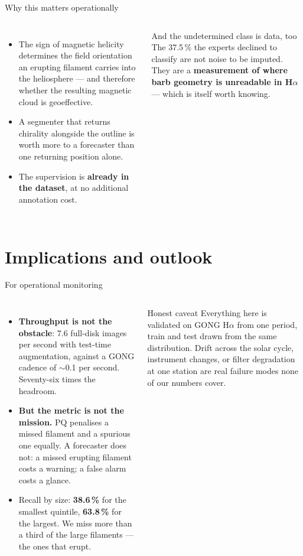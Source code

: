 \documentclass[aspectratio=169,xcolor=dvipsnames]{beamer}
\begin{document}
\begin{frame}{Why this matters operationally}
  \begin{columns}
      \begin{itemize}
        \item The sign of magnetic helicity determines the field orientation an erupting filament carries into the heliosphere --- and therefore whether the resulting magnetic cloud is geoeffective.
        \item A segmenter that returns chirality alongside the outline is worth more to a forecaster than one returning position alone.
        \item The supervision is \textbf{already in the dataset}, at no additional annotation cost.
      \end{itemize}
      \begin{exampleblock}{And the undetermined class is data, too}
        \small
        The 37.5\,\% the experts declined to classify are not noise to be imputed. They are a \textbf{measurement of where barb geometry is unreadable in H$\alpha$} --- which is itself worth knowing.
      \end{exampleblock}
  \end{columns}
\end{frame}

\section{Implications and outlook}

\begin{frame}{For operational monitoring}
  \begin{columns}
      \begin{itemize}
        \item \textbf{Throughput is not the obstacle}: 7.6 full-disk images per second with test-time augmentation, against a GONG cadence of $\sim$0.1 per second. Seventy-six times the headroom.
        \item \textbf{But the metric is not the mission.} PQ penalises a missed filament and a spurious one equally. A forecaster does not: a missed erupting filament costs a warning; a false alarm costs a glance.
        \item Recall by size: \textbf{38.6\,\%} for the smallest quintile, \textbf{63.8\,\%} for the largest. We miss more than a third of the large filaments --- the ones that erupt.
      \end{itemize}
      \begin{alertblock}{Honest caveat}
        \small
        Everything here is validated on GONG H$\alpha$ from one period, train and test drawn from the same distribution. Drift across the solar cycle, instrument changes, or filter degradation at one station are real failure modes none of our numbers cover.
      \end{alertblock}
  \end{columns}
\end{frame}
\end{document}
